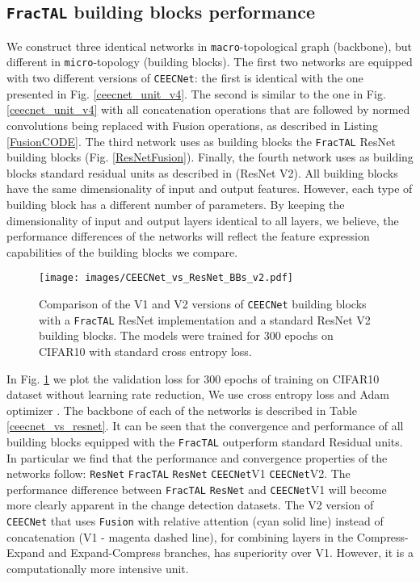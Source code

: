 \documentclass[times, 5p]{elsarticle}
\def \FracTAL {\texttt{FracTAL} }
\newcommand{\ceecnet}{\texttt{CEECNet}}
\begin{document}
\subsection{\FracTAL building blocks performance}

 We construct three identical networks in \texttt{macro}-topological graph (backbone), but different in \texttt{micro}-topology (building blocks). The first two networks are equipped  with two different versions of \ceecnet: the first is identical with the one presented in Fig.  \ref{ceecnet_unit_v4}. The second is similar to the one in Fig.  \ref{ceecnet_unit_v4} with all concatenation operations that are followed by normed convolutions being replaced with Fusion operations, as described in Listing \ref{FusionCODE}. 
The third network uses as building blocks the \FracTAL ResNet building blocks (Fig.  \ref{ResNetFusion}). 
 Finally, the fourth network uses as building blocks standard residual units  as described in \cite{DBLP:journals/corr/HeZRS15,DBLP:journals/corr/HeZR016} (ResNet V2). All building blocks have the same dimensionality of input and output features. However, each type of building block has a different number of parameters. By keeping  the dimensionality of input and output layers  identical to all layers, we believe, the performance differences of the networks will reflect  the feature expression capabilities of the building blocks we compare. 
 

\begin{figure}
\centering
\texttt{[image: images/CEECNet\_vs\_ResNet\_BBs\_v2.pdf]}
\caption{Comparison of the V1 and V2 versions of  \ceecnet{} building blocks with  a \FracTAL ResNet implementation and a standard ResNet V2 building blocks. The models were trained for 300 epochs on CIFAR10 with standard cross entropy loss.} 
\label{CEECNet_vs_ResNet_comparison}
\end{figure}

 In Fig. \ref{CEECNet_vs_ResNet_comparison} we plot the validation loss for 300 epochs of training on CIFAR10  dataset \citep{Krizhevsky09learningmultiple} without learning rate reduction, We use cross entropy loss and Adam optimizer \citep{DBLP:journals/corr/KingmaB14}. The backbone of each of the networks is described in Table \ref{ceecnet_vs_resnet}. 
It can be seen  that the convergence and performance of all building blocks equipped with the \FracTAL outperform standard Residual units. In particular we find that the performance and convergence properties of the networks follow:
\texttt{ResNet}  \FracTAL{}\texttt{ResNet}  \ceecnet V1  \ceecnet V2. The performance difference between \FracTAL{}\texttt{ResNet} and \ceecnet V1 will become more clearly apparent in the change detection datasets.  The V2 version of \ceecnet{} that uses \texttt{Fusion} with relative attention (cyan solid line) instead of concatenation (V1 - magenta dashed line), for combining layers in the Compress-Expand and Expand-Compress branches, has superiority over V1. However, it is a computationally more  intensive unit.
\end{document}
